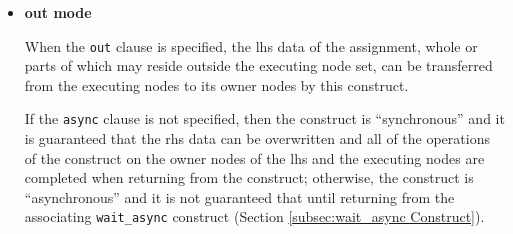 \begin{itemize}
 \item {\bf out mode}

       When the {\tt out} clause is specified, the lhs data of the
       assignment, whole or parts of which may reside outside the 
       executing node set, can be transferred from the executing nodes
       to its owner nodes by this construct.

       If the {\tt async} clause is not specified, then the construct is
       ``synchronous'' and it is guaranteed that the rhs data
       can be overwritten and all of the operations of the construct on
       the owner nodes of the lhs and the executing nodes are
       completed when returning from the construct; otherwise, the
       construct is ``asynchronous'' and it is not guaranteed that until
       returning from the associating {\tt wait\_async} construct
       (Section \ref{subsec:wait_async Construct}).

\end{itemize}


%



